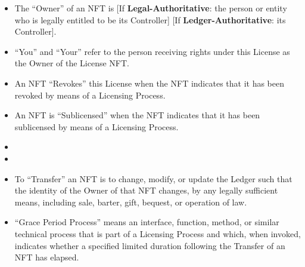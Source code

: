 \documentclass{article}
\newcommand{\keyword}[1]{\textbf{#1}\xspace}
\newcommand{\derivativetracking}{\keyword{Derivatives-NFT}}
\newcommand{\sharealike}{\keyword{Derivatives-NFT-Share-Alike}}
\newcommand{\ledger}{\keyword{Ledger-Authoritative}}
\newcommand{\legal}{\keyword{Legal-Authoritative}}
\newcommand{\iflicenseoption}[2]{[\colorbox{light-gray}{If #1:} #2]}
\begin{document}
\begin{sffamily}
\begin{itemize}
	\item	 The ``Owner'' of an NFT is \iflicenseoption{\legal}{the person or entity who is legally entitled to be its Controller} \iflicenseoption{\ledger}{its Controller}.
		
	\item	``You'' and ``Your'' refer to the person receiving rights under this License as the Owner of the License NFT.

	\item	An NFT ``Revokes'' this License when the NFT indicates that it has been revoked by means of a Licensing Process.

	\item	An NFT is ``Sublicensed'' when the NFT indicates that it has been sublicensed by means of a Licensing Process.

	\item 	\iflicenseoption{\derivativetracking}{Adapted Material is ``Derivative Tracked'' from an NFT (the ``Parent NFT'') when the Parent NFT is Sublicensed by means of a Licensing Process that (1) creates another NFT (the ``Child NFT'') on the same Ledger as the Parent NFT, (2) causes the Child NFT to be Linked to Adapted Material, and (3) causes the Child NFT and Parent NFT to have materially the same properties and functionality, except for the identity of the parties they are Associated with and the identity of the material they are Linked to.}

	\item 	\iflicenseoption{\sharealike}{Adapted Material is ``Share-Alike Sublicensed'' from an NFT (the ``Parent NFT'') when the Parent NFT is Sublicensed by means of a Licensing Process that (1) creates another NFT (the ``Child NFT'') on the same Ledger as the Parent NFT, (2) causes the Child NFT to be Linked to Adapted Material, (3) causes the Child NFT and Parent NFT to have materially the same properties and functionality, except for the identity of the parties they are Associated with and the identity of the material they are Linked to, and (4) causes the Child NFT to Invoke this license.}

	\item	To ``Transfer'' an NFT is to change, modify, or update the Ledger such that the identity of the Owner of that NFT changes, by any legally sufficient means, including sale, barter, gift, bequest, or operation of law. 
		
	\item ``Grace Period Process'' means an interface, function, method, or similar technical process that is part of a Licensing Process and which, when invoked, indicates whether a specified limited duration following the Transfer of an NFT has elapsed.
	

\end{itemize}
\end{sffamily}
\end{document}
